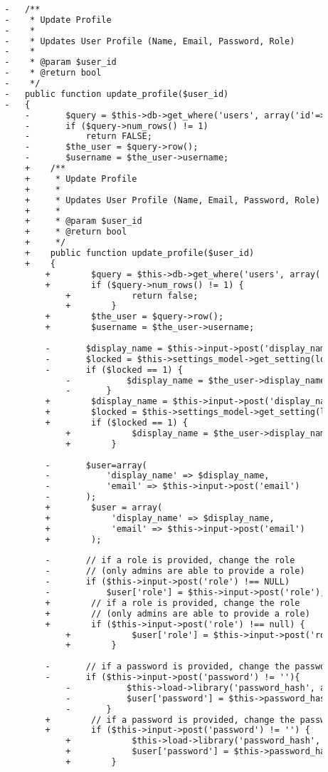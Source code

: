 \begin{lstlisting}[language=diff, caption=Perubahan pada kode User\_model.php]
		
		-	/**
		-	 * Update Profile
		-	 *
		-	 * Updates User Profile (Name, Email, Password, Role)
		-	 *
		-	 * @param $user_id
		-	 * @return bool
		-	 */
		-	public function update_profile($user_id)
		-	{
			-		$query = $this->db->get_where('users', array('id'=>$user_id));
			-		if ($query->num_rows() != 1)
			-			return FALSE;
			-		$the_user = $query->row();
			-		$username = $the_user->username;
			+    /**
			+     * Update Profile
			+     *
			+     * Updates User Profile (Name, Email, Password, Role)
			+     *
			+     * @param $user_id
			+     * @return bool
			+     */
			+    public function update_profile($user_id)
			+    {
				+        $query = $this->db->get_where('users', array('id' => $user_id));
				+        if ($query->num_rows() != 1) {
					+            return false;
					+        }
				+        $the_user = $query->row();
				+        $username = $the_user->username;
				
				-		$display_name = $this->input->post('display_name');
				-		$locked = $this->settings_model->get_setting(lock_student_display_name);
				-		if ($locked == 1) {
					-			$display_name = $the_user->display_name;
					-		}
				+        $display_name = $this->input->post('display_name');
				+        $locked = $this->settings_model->get_setting(lock_student_display_name);
				+        if ($locked == 1) {
					+            $display_name = $the_user->display_name;
					+        }
				
				-		$user=array(
				-			'display_name' => $display_name,
				-			'email' => $this->input->post('email')
				-		);
				+        $user = array(
				+            'display_name' => $display_name,
				+            'email' => $this->input->post('email')
				+        );
				
				-		// if a role is provided, change the role
				-		// (only admins are able to provide a role)
				-		if ($this->input->post('role') !== NULL)
				-			$user['role'] = $this->input->post('role');
				+        // if a role is provided, change the role
				+        // (only admins are able to provide a role)
				+        if ($this->input->post('role') !== null) {
					+            $user['role'] = $this->input->post('role');
					+        }
				
				-		// if a password is provided, change the password:
				-		if ($this->input->post('password') != ''){
					-			$this->load->library('password_hash', array(8, FALSE));
					-			$user['password'] = $this->password_hash->HashPassword($this->input->post('password'));
					-		}
				+        // if a password is provided, change the password:
				+        if ($this->input->post('password') != '') {
					+            $this->load->library('password_hash', array(8, false));
					+            $user['password'] = $this->password_hash->HashPassword($this->input->post('password'));
					+        }
				

\end{lstlisting}
